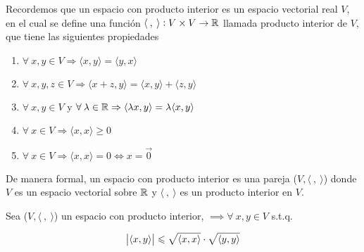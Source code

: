 \begin{definition}
    Recordemos que un espacio con producto interior es un espacio vectorial real $V$, en el cual se define una función $\langle \: , \: \rangle : V \times V \to \mathbb{R}$ llamada producto interior de $V$, que tiene las siguientes propiedades
        \begin{enumerate}[label=(\subscript{P}{{\arabic*}})]
        \item $\forall \: x,y \in V \Rightarrow \langle x,y \rangle = \langle y,x \rangle$
        \item $\forall \: x,y,z \in V \Rightarrow \langle x+z,y\rangle = \langle x,y \rangle+\langle z,y\rangle$
        \item  $\forall \: x,y \in V $ y $ \forall \: \lambda \in \mathbb{R} \Rightarrow \langle \lambda x,y \rangle = \lambda \langle x,y \rangle$
        \item $\forall \: x \in V  \Rightarrow \langle x,x \rangle \geqslant 0$
        \item $\forall \: x \in V  \Rightarrow \langle x,x \rangle = 0 \iff x = \vec{0}$
        \end{enumerate}
    De manera formal, un espacio con producto interior es una pareja ($V, \langle \: , \: \rangle$) donde $V$ es un espacio vectorial sobre $\mathbb{R}$ y  $\langle \: , \: \rangle$ es un producto interior en $V$.
\end{definition}

\begin{theorem} \label{theom3}
    Sea ($V, \langle \: , \: \rangle$) un espacio con producto interior, $ \implies  \forall \: x,y \in V$ s.t.q.

    \begin{equation*}
        \abs{\langle x,y \rangle} \leqslant \sqrt{\langle x,x \rangle} \cdot \sqrt{\langle y,y \rangle}
    \end{equation*}
\end{theorem}

